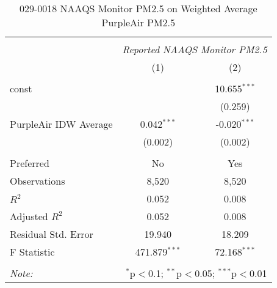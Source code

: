 \begin{table}[!htbp] \centering
  \caption{029-0018 NAAQS Monitor PM2.5 on Weighted Average PurpleAir PM2.5}
  \label{tab:reg_029-0018}
\begin{tabular}{@{\extracolsep{5pt}}lcc}
\\[-1.8ex]\hline
\hline \\[-1.8ex]
& \multicolumn{2}{c}{\textit{Reported NAAQS Monitor PM2.5}} \
\cr \cline{2-3}
\\[-1.8ex] & (1) & (2) \\
\hline \\[-1.8ex]
 const & & 10.655$^{***}$ \\
  & & (0.259) \\
 PurpleAir IDW Average & 0.042$^{***}$ & -0.020$^{***}$ \\
  & (0.002) & (0.002) \\
\hline \\[-1.8ex]
 Preferred & No & Yes \\
 Observations & 8,520 & 8,520 \\
 $R^2$ & 0.052 & 0.008 \\
 Adjusted $R^2$ & 0.052 & 0.008 \\
 Residual Std. Error & 19.940 & 18.209  \\
 F Statistic & 471.879$^{***}$  & 72.168$^{***}$  \\
\hline
\hline \\[-1.8ex]
\textit{Note:} & \multicolumn{2}{r}{$^{*}$p$<$0.1; $^{**}$p$<$0.05; $^{***}$p$<$0.01} \\
\end{tabular}
\end{table}